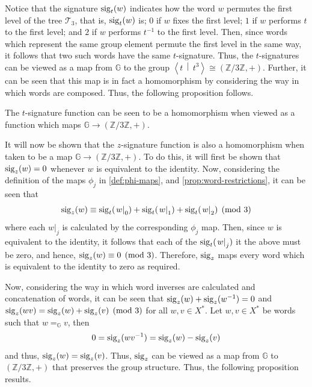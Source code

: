 Notice that the signature $\operatorname{sig}_t(w)$ indicates how the word $w$ permutes the first level of the tree $\mathcal{T}_3$, that is, $\operatorname{sig}_t(w)$ is; $0$ if $w$ fixes the first level; $1$ if $w$ performs $t$ to the first level; and $2$ if $w$ performs $t^{-1}$ to the first level.
Then, since words which represent the same group element permute the first level in the same way, it follows that two such words have the same $t$-signature.
Thus, the $t$-signatures can be viewed as a map from $\mathbb{G}$ to the group $\left\langle t \, \middle\vert \, t^3 \right\rangle \cong (\mathbb{Z}/3\mathbb{Z},+)$.
Further, it can be seen that this map is in fact a homomorphism by considering the way in which words are composed.
Thus, the following proposition follows.

\begin{proposition}
	The $t$-signature function can be seen to be a homomorphism when viewed as a function which maps $\mathbb{G} \to (\mathbb{Z}/3\mathbb{Z},+)$.
	\thmendmark
\end{proposition}

It will now be shown that the $z$-signature function is also a homomorphism when taken to be a map $\mathbb{G} \to (\mathbb{Z}/3\mathbb{Z},+)$.
To do this, it will first be shown that $\operatorname{sig}_z(w) = 0$ whenever $w$ is equivalent to the identity. Now, considering the definition of the maps $\phi_j$ in \cref{def:phi-maps}, and \cref{prop:word-restrictions}, it can be seen that
\[
  \operatorname{sig}_z(w)
  \equiv
  \operatorname{sig}_t(\left. w \right\vert_0) +
  \operatorname{sig}_t(\left. w \right\vert_1) +
  \operatorname{sig}_t(\left. w \right\vert_2)
  \pmod{3}
\]
where each $\left. w \right\vert_j$ is calculated by the corresponding $\phi_j$ map.
Then, since $w$ is equivalent to the identity, it follows that each of the $\operatorname{sig}_t(\left. w \right\vert_j)$ it the above must be zero, and hence, $\operatorname{sig}_z(w) \equiv 0 \pmod{3}$.
Therefore, $\operatorname{sig}_z$ maps every word which is equivalent to the identity to zero as required.

Now, considering the way in which word inverses are calculated and concatenation of words, it can be seen that $\operatorname{sig}_z(w) + \operatorname{sig}_z(w^{-1}) = 0$ and $\operatorname{sig}_z(wv) = \operatorname{sig}_z(w) + \operatorname{sig}_z(v) \pmod{3}$ for all $w,v\in X^\ast$.
Let $w,v\in X^\ast$ be words such that $w =_\mathbb{G} v$, then
\[
  0 = \operatorname{sig}_z(w v ^{-1}) = \operatorname{sig}_z(w) - \operatorname{sig}_z(v)
\]
and thus, $\operatorname{sig}_z(w) = \operatorname{sig}_z(v)$.
Thus, $\operatorname{sig}_z$ can be viewed as a map from $\mathbb{G}$ to $(\mathbb{Z}/3\mathbb{Z},+)$ that preserves the group structure.
Thus, the following proposition results.

